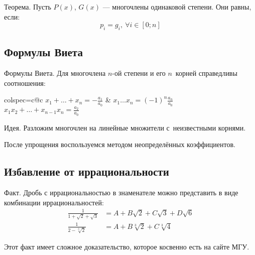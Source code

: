\begin{theorem}
{\bold Теорема.} Пусть $P(x)$, $G(x)$ --- многочлены одинаковой степени. Они {\ital равны}, если:
$$p_i=g_i,\ \forall i\in[0;n]$$ 
\end{theorem}

\subsection{Формулы Виета}

\begin{theorem}
{\bold Формулы Виета.} Для многочлена $n$-ой степени и его $n$~корней справедливы соотношения:

{\centering\begin{tblr}{colspec={c@{\qquad}c}}
$\displaystyle x_1+\dots+x_n=-\frac{a_1}{a_0}$ & $\displaystyle x_1\dots x_n=(-1)^{n}\frac{a_n}{a_0}$\\
$\displaystyle x_1x_2+\dots+x_{n-1}x_n=\frac{a_2}{a_0}$\\
\end{tblr}\par}
\end{theorem}

{\bold Идея.} Разложим многочлен на {\ital линейные множители} с~неизвестными корнями.

После упрощения воспользуемся {\ital методом неопределённых коэффициентов}.

\subsection{Избавление от иррациональности}

\begin{theorem}
{\bold Факт.} Дробь с иррациональностью в знаменателе можно представить в виде {\ital комбинации} иррациональностей:
$$\begin{aligned}\frac{1}{1+\sqrt{2}+\sqrt{3}}&=A+B\sqrt{2}+C\sqrt{3}+D\sqrt{6}\\
\frac{1}{2-\sqrt[3]{2}}&=A+B\sqrt[3]{2}+C\sqrt[3]{4}
\end{aligned}$$
\end{theorem}
Этот факт имеет сложное доказательство, которое косвенно есть на сайте МГУ. 
